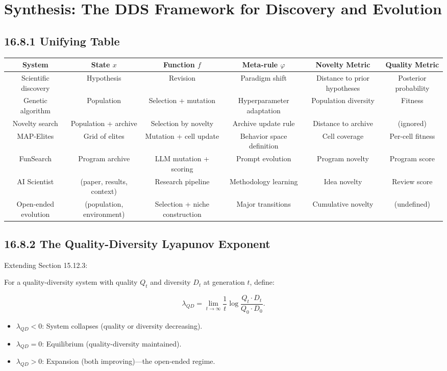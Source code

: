 \section{Synthesis: The DDS Framework for Discovery and Evolution}

\subsection{16.8.1 Unifying Table}

\begin{center}
\begin{tabular}{cccccc}
\toprule
System & State $x$ & Function $f$ & Meta-rule $\varphi$ & Novelty Metric & Quality Metric \\
\midrule
Scientific discovery & Hypothesis & Revision & Paradigm shift & Distance to prior hypotheses & Posterior probability \\
Genetic algorithm & Population & Selection + mutation & Hyperparameter adaptation & Population diversity & Fitness \\
Novelty search & Population + archive & Selection by novelty & Archive update rule & Distance to archive & (ignored) \\
MAP-Elites & Grid of elites & Mutation + cell update & Behavior space definition & Cell coverage & Per-cell fitness \\
FunSearch & Program archive & LLM mutation + scoring & Prompt evolution & Program novelty & Program score \\
AI Scientist & (paper, results, context) & Research pipeline & Methodology learning & Idea novelty & Review score \\
Open-ended evolution & (population, environment) & Selection + niche construction & Major transitions & Cumulative novelty & (undefined) \\
\bottomrule
\end{tabular}
\end{center}

\subsection{16.8.2 The Quality-Diversity Lyapunov Exponent}

Extending Section 15.12.3:

\begin{definition}
For a quality-diversity system with quality $Q_t$ and diversity $D_t$ at generation $t$, define:

\[\lambda_{QD} = \lim_{t \to \infty} \frac{1}{t} \log \frac{Q_t \cdot D_t}{Q_0 \cdot D_0}.\]

\begin{itemize}
\item $\lambda_{QD} < 0$: System collapses (quality or diversity decreasing).
\item $\lambda_{QD} = 0$: Equilibrium (quality-diversity maintained).
\item $\lambda_{QD} > 0$: Expansion (both improving)---the open-ended regime.
\end{itemize}
\end{definition}

